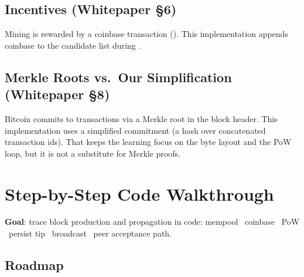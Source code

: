 \subsection{Incentives (Whitepaper \S6)}
\label{sec:ch09-6-incentives}

Mining is rewarded by a coinbase transaction (). This implementation appends coinbase to the candidate list during .

\subsection{Merkle Roots vs.\ Our Simplification (Whitepaper \S8)}
\label{sec:ch09-6-merkle}

Bitcoin commits to transactions via a Merkle root in the block header. This implementation uses a simplified  commitment (a hash over concatenated transaction ids). That keeps the learning focus on the byte layout and the PoW loop, but it is not a substitute for Merkle proofs.

\needspace{3in}
\section{Step-by-Step Code Walkthrough}
\label{sec:ch09-6-walkthrough}

\textbf{Goal}: trace block production and propagation in code: mempool \textrightarrow\ coinbase \textrightarrow\ PoW \textrightarrow\ persist tip \textrightarrow\ broadcast \textrightarrow\ peer acceptance path.

\subsection{Roadmap}
\label{sec:ch09-6-roadmap}

